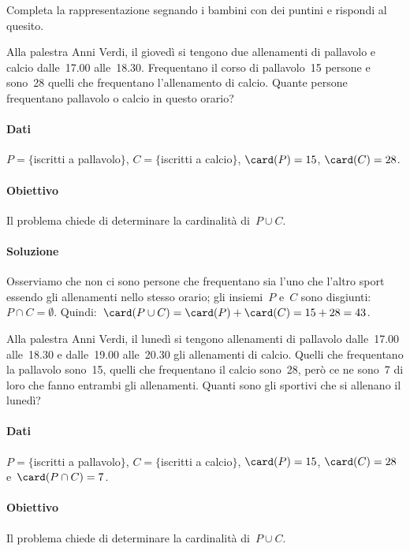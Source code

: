 \begin{exrig}
\begin{esempio}
Completa la rappresentazione segnando i bambini con dei puntini e rispondi al quesito.
\end{esempio}

\begin{esempio}
Alla palestra Anni Verdi, il giovedì si tengono due allenamenti di pallavolo e calcio dalle~17.00 alle~18.30. Frequentano il corso di
pallavolo~15 persone e sono~28 quelli che frequentano l'allenamento di calcio. Quante persone frequentano
pallavolo o calcio in questo orario?
\paragraph{Dati} $P=\{$iscritti a pallavolo$\}$, $C=\{$iscritti a calcio$\}$, $\card(P)=15$, $\card(C)=28$.
\paragraph{Obiettivo} Il problema chiede di determinare la cardinalità di~$P\cup C$.
\paragraph{Soluzione} Osserviamo che non ci sono persone che frequentano sia
l'uno che l'altro sport essendo gli allenamenti nello stesso orario; gli insiemi~$P$ e~$C$
sono disgiunti:~$P\cap C=\emptyset $. Quindi:~$\card(P\cup C)=\card(P)+\card(C)=15+28=43$.
\end{esempio}

\begin{esempio}
\begin{multicols}{2}
 Alla palestra Anni Verdi, il lunedì si tengono allenamenti di pallavolo dalle~17.00 alle~18.30 e dalle~19.00 alle~20.30 gli
allenamenti di calcio. Quelli che frequentano la pallavolo sono~15, quelli che frequentano il calcio sono~28, però ce ne sono~7 di loro
che fanno entrambi gli allenamenti. Quanti sono gli sportivi che si allenano il lunedì?
\begin{center}
 
 \end{center}
\end{multicols}
\paragraph{Dati} $P=\{$iscritti a pallavolo$\}$, $C=\{$iscritti a calcio$\}$, $\card(P)=15$, $\card(C)=28$ e~$\card(P\cap C)=7$.\paragraph{Obiettivo} Il problema chiede di determinare la cardinalità di~$P\cup C$.

\end{esempio}
\end{exrig}
